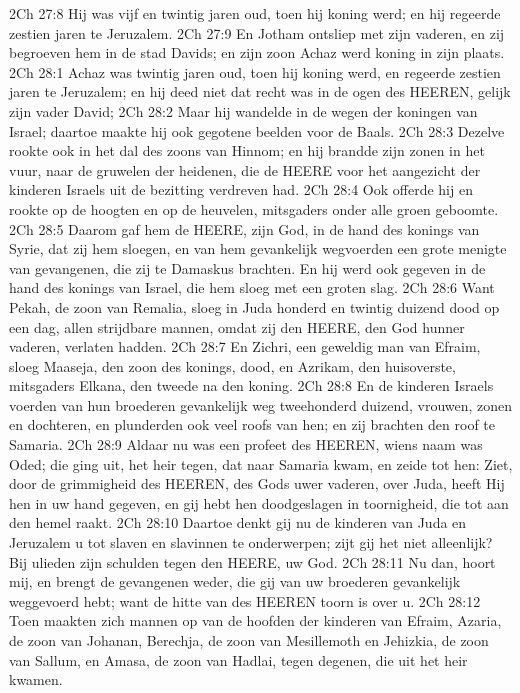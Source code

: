 2Ch 27:8  Hij was vijf en twintig jaren oud, toen hij koning werd; en hij regeerde zestien jaren te Jeruzalem.
2Ch 27:9  En Jotham ontsliep met zijn vaderen, en zij begroeven hem in de stad Davids; en zijn zoon Achaz werd koning in zijn plaats.
2Ch 28:1  Achaz was twintig jaren oud, toen hij koning werd, en regeerde zestien jaren te Jeruzalem; en hij deed niet dat recht was in de ogen des HEEREN, gelijk zijn vader David;
2Ch 28:2  Maar hij wandelde in de wegen der koningen van Israel; daartoe maakte hij ook gegotene beelden voor de Baals.
2Ch 28:3  Dezelve rookte ook in het dal des zoons van Hinnom; en hij brandde zijn zonen in het vuur, naar de gruwelen der heidenen, die de HEERE voor het aangezicht der kinderen Israels uit de bezitting verdreven had.
2Ch 28:4  Ook offerde hij en rookte op de hoogten en op de heuvelen, mitsgaders onder alle groen geboomte.
2Ch 28:5  Daarom gaf hem de HEERE, zijn God, in de hand des konings van Syrie, dat zij hem sloegen, en van hem gevankelijk wegvoerden een grote menigte van gevangenen, die zij te Damaskus brachten. En hij werd ook gegeven in de hand des konings van Israel, die hem sloeg met een groten slag.
2Ch 28:6  Want Pekah, de zoon van Remalia, sloeg in Juda honderd en twintig duizend dood op een dag, allen strijdbare mannen, omdat zij den HEERE, den God hunner vaderen, verlaten hadden.
2Ch 28:7  En Zichri, een geweldig man van Efraim, sloeg Maaseja, den zoon des konings, dood, en Azrikam, den huisoverste, mitsgaders Elkana, den tweede na den koning.
2Ch 28:8  En de kinderen Israels voerden van hun broederen gevankelijk weg tweehonderd duizend, vrouwen, zonen en dochteren, en plunderden ook veel roofs van hen; en zij brachten den roof te Samaria.
2Ch 28:9  Aldaar nu was een profeet des HEEREN, wiens naam was Oded; die ging uit, het heir tegen, dat naar Samaria kwam, en zeide tot hen: Ziet, door de grimmigheid des HEEREN, des Gods uwer vaderen, over Juda, heeft Hij hen in uw hand gegeven, en gij hebt hen doodgeslagen in toornigheid, die tot aan den hemel raakt.
2Ch 28:10  Daartoe denkt gij nu de kinderen van Juda en Jeruzalem u tot slaven en slavinnen te onderwerpen; zijt gij het niet alleenlijk? Bij ulieden zijn schulden tegen den HEERE, uw God.
2Ch 28:11  Nu dan, hoort mij, en brengt de gevangenen weder, die gij van uw broederen gevankelijk weggevoerd hebt; want de hitte van des HEEREN toorn is over u.
2Ch 28:12  Toen maakten zich mannen op van de hoofden der kinderen van Efraim, Azaria, de zoon van Johanan, Berechja, de zoon van Mesillemoth en Jehizkia, de zoon van Sallum, en Amasa, de zoon van Hadlai, tegen degenen, die uit het heir kwamen.
